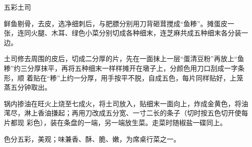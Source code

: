 %
%
%
%
%
%
%
\begin{recipe}{五彩土司}

\ingredients


\preparation

\step 鲜鱼剔骨，去皮，选净细刺后，与肥膘分别用刀背砸茸搅成“鱼糁”。摊蛋皮一
张，连同火腿、木耳、绿色小菜分别切成各种细末，连芝麻共成五种细末各分装一边。

\step 土司修去周围的皮后，切成二分厚的片，先在一面抹上一层“蛋清豆粉”再放上“鱼
糁”约三分厚抹平，再将五种细末一样样摊开在墩子上，分颜色用刀口刮成一字条形，顺
着贴在“糁”上约一分厚，用手按平不脱，自成五色，每片同样贴好，上笼蒸五分钟取出。

\step 锅内掺油在旺火上烧至七成火，将土司放入，贴细末一面向上，炸成金黄色，将油
滗尽，淋上香油搛起；再用刀改成五分宽、一寸二长的条子（切时按五色切开使每片都现
彩色），装在条盘的一端，另一端放生菜。走菜时随椒盐一碟同上。

\features

色分五彩，美观；味兼香、酥、脆、嫩，为席桌行菜之一。

\end{recipe}

